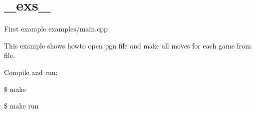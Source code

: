\hypertarget{_exs_-example}{
\section{\_\-exs\_\-}
}
First example examples/main.cpp

This example shows howto open pgn file and make all moves for each game from file.

Compile and run:

\$ make 

\$ make run


\begin{DoxyCodeInclude}
\end{DoxyCodeInclude}
 